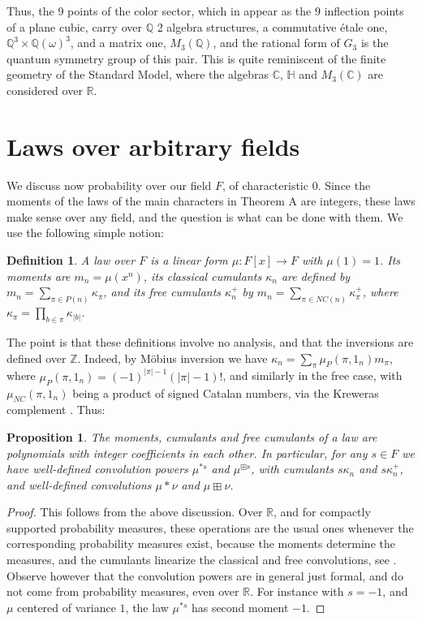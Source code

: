 \documentclass[11pt]{amsart}
\newtheorem{proposition}[theorem]{Proposition}
\newtheorem{definition}[theorem]{Definition}
\theoremstyle{definition}
\begin{document}
Thus, the 9 points of the color sector, which in \cite{bop} appear as the 9 inflection points of a plane cubic, carry over $\mathbb Q$ 2 algebra structures, a commutative étale one, $\mathbb Q^3\times\mathbb Q(\omega)^3$, and a matrix one, $M_3(\mathbb Q)$, and the rational form of $G_3$ is the quantum symmetry group of this pair. This is quite reminiscent of the finite geometry of the Standard Model, where the algebras $\mathbb C$, $\mathbb H$ and $M_3(\mathbb C)$ are considered over $\mathbb R$.

\section{Laws over arbitrary fields}

We discuss now probability over our field $F$, of characteristic 0. Since the moments of the laws of the main characters in Theorem A are integers, these laws make sense over any field, and the question is what can be done with them. We use the following simple notion:

\begin{definition}
A law over $F$ is a linear form $\mu:F[x]\to F$ with $\mu(1)=1$. Its moments are $m_n=\mu(x^n)$, its classical cumulants $\kappa_n$ are defined by $m_n=\sum_{\pi\in P(n)}\kappa_\pi$, and its free cumulants $\kappa^+_n$ by $m_n=\sum_{\pi\in NC(n)}\kappa^+_\pi$, where $\kappa_\pi=\prod_{b\in\pi}\kappa_{|b|}$.
\end{definition}

The point is that these definitions involve no analysis, and that the inversions are defined over $\mathbb Z$. Indeed, by Möbius inversion we have $\kappa_n=\sum_\pi\mu_P(\pi,1_n)m_\pi$, where $\mu_P(\pi,1_n)=(-1)^{|\pi|-1}(|\pi|-1)!$, and similarly in the free case, with $\mu_{NC}(\pi,1_n)$ being a product of signed Catalan numbers, via the Kreweras complement \cite{kre,nsp}. Thus:

\begin{proposition}
\label{p62}
The moments, cumulants and free cumulants of a law are polynomials with integer coefficients in each other. In particular, for any $s\in F$ we have well-defined convolution powers $\mu^{*s}$ and $\mu^{\boxplus s}$, with cumulants $s\kappa_n$ and $s\kappa^+_n$, and well-defined convolutions $\mu*\nu$ and $\mu\boxplus\nu$.
\end{proposition}

\begin{proof}
This follows from the above discussion. Over $\mathbb R$, and for compactly supported probability measures, these operations are the usual ones whenever the corresponding probability measures exist, because the moments determine the measures, and the cumulants linearize the classical and free convolutions, see \cite{nsp}. Observe however that the convolution powers are in general just formal, and do not come from probability measures, even over $\mathbb R$. For instance with $s=-1$, and $\mu$ centered of variance $1$, the law $\mu^{*s}$ has second moment $-1$.
\end{proof}
\end{document}
